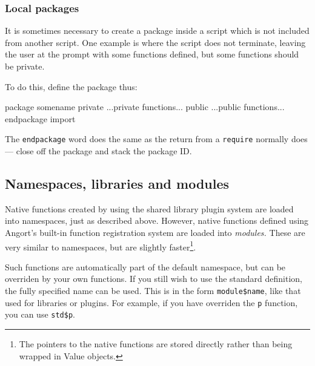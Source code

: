 \subsubsection{Local packages}
It is sometimes necessary to create a package inside a script which
is not included from another script. One example is where the script
does not terminate, leaving the user at the prompt with some functions defined,
but some functions should be private.

To do this, define the package thus:
\begin{v}
package somename
private
...private functions...
public
...public functions...
endpackage import
\end{v}
The \texttt{endpackage} word does the same as the return from a 
\texttt{require} normally does --- close off the package and
stack the package ID.

\subsection{Namespaces, libraries and modules}
\label{nameslibsmods}
Native functions created by using the shared library plugin system
are loaded into namespaces, just as described above. However, native
functions defined using Angort's built-in function registration system
are loaded into \emph{modules.} These are very similar to namespaces,
but are slightly faster\footnote{The pointers to the native functions
are stored directly rather than being wrapped in Value objects.}. 

Such functions are automatically part of the default namespace, but can
be overriden by your own functions. If you still wish to use the standard
definition, the fully specified name can be used. This is in the form
\verb+module$name+, like that used for libraries or plugins. For example,
if you have overriden the \texttt{p} function, you can use \verb+std$p+.

